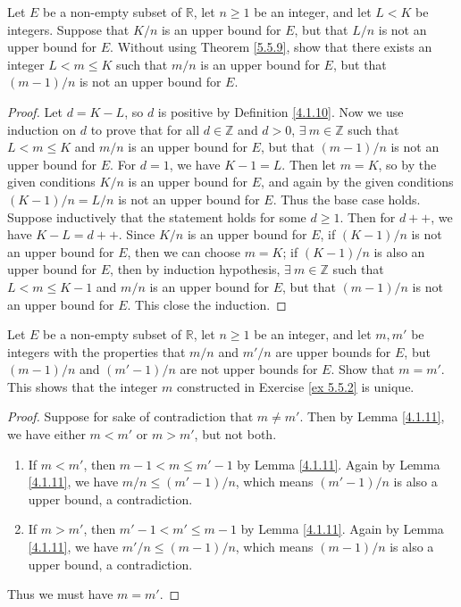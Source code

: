 \begin{exercise}\label{ex 5.5.2}
Let \(E\) be a non-empty subset of \(\mathds{R}\), let \(n \geq 1\) be an integer, and let \(L < K\) be integers.
Suppose that \(K / n\) is an upper bound for \(E\), but that \(L / n\) is not an upper bound for \(E\).
Without using Theorem \ref{5.5.9}, show that there exists an integer \(L < m \leq K\) such that \(m / n\) is an upper bound for \(E\), but that \((m - 1) / n\) is not an upper bound for \(E\).
\end{exercise}

\begin{proof}
Let \(d = K - L\), so \(d\) is positive by Definition \ref{4.1.10}.
Now we use induction on \(d\) to prove that for all \(d \in \mathds{Z}\) and \(d > 0\), \(\exists\ m \in \mathds{Z}\) such that \(L < m \leq K\) and \(m / n\) is an upper bound for \(E\), but that \((m - 1) / n\) is not an upper bound for \(E\).
For \(d = 1\), we have \(K - 1 = L\).
Then let \(m = K\), so by the given conditions \(K / n\) is an upper bound for \(E\), and again by the given conditions \((K - 1) / n = L / n\) is not an upper bound for \(E\).
Thus the base case holds.
Suppose inductively that the statement holds for some \(d \geq 1\).
Then for \(d++\), we have \(K - L = d++\).
Since \(K / n\) is an upper bound for \(E\), if \((K - 1) / n\) is not an upper bound for \(E\), then we can choose \(m = K\);
if \((K - 1) / n\) is also an upper bound for \(E\), then by induction hypothesis, \(\exists\ m \in \mathds{Z}\) such that \(L < m \leq K - 1\) and \(m / n\) is an upper bound for \(E\), but that \((m - 1) / n\) is not an upper bound for \(E\).
This close the induction.
\end{proof}

\begin{exercise}\label{ex 5.5.3}
Let \(E\) be a non-empty subset of \(\mathds{R}\), let \(n \geq 1\) be an integer, and let \(m, m'\) be integers with the properties that \(m / n\) and \(m' / n\) are upper bounds for \(E\), but \((m - 1) / n\) and \((m' - 1) / n\) are not upper bounds for \(E\).
Show that \(m = m'\).
This shows that the integer \(m\) constructed in Exercise \ref{ex 5.5.2} is unique.
\end{exercise}

\begin{proof}
Suppose for sake of contradiction that \(m \neq m'\).
Then by Lemma \ref{4.1.11}, we have either \(m < m'\) or \(m > m'\), but not both.
\begin{enumerate}
    \item If \(m < m'\), then \(m - 1 < m \leq m' - 1\) by Lemma \ref{4.1.11}.
    Again by Lemma \ref{4.1.11}, we have \(m / n \leq (m' - 1) / n\), which means \((m' - 1) / n\) is also a upper bound, a contradiction.
    \item If \(m > m'\), then \(m' - 1 < m' \leq m - 1\) by Lemma \ref{4.1.11}.
    Again by Lemma \ref{4.1.11}, we have \(m' / n \leq (m - 1) / n\), which means \((m - 1) / n\) is also a upper bound, a contradiction.
\end{enumerate}
Thus we must have \(m = m'\).
\end{proof}

